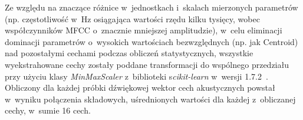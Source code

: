 \documentclass{article}
\begin{document}
    

Ze względu na znaczące różnice w~jednostkach i~skalach mierzonych parametrów (np. częstotliwość w~Hz osiągająca wartości rzędu kilku tysięcy, wobec współczynników MFCC o~znacznie mniejszej amplitudzie), w~celu eliminacji dominacji parametrów o~wysokich wartościach bezwzględnych (np. jak Centroid) nad pozostałymi cechami podczas obliczeń statystycznych, wszystkie wyekstrahowane cechy zostały poddane transformacji do wspólnego przedziału  przy użyciu klasy \textit{MinMaxScaler} z~biblioteki s\textit{cikit-learn} w~wersji 1.7.2~\cite{pedregosa2011scikit}. 
Obliczony dla każdej próbki dźwiękowej wektor cech akustycznych powstał w wyniku połączenia składowych, uśrednionych wartości dla każdej z~obliczanej cechy, w~sumie 16 cech.
\end{document}
